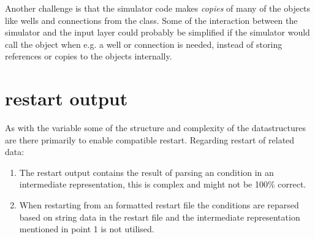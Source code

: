 Another challenge is that the simulator code makes \emph{copies} of many of the
objects like wells and connections from the  class. Some of
the interaction between the simulator and the input layer could probably be
simplified if the simulator would call the  object when
e.g. a well or connection is needed, instead of storing references or copies to
the  objects internally.

\section{\actionx{} restart output}
As with the \udq{} variable some of the structure and complexity of the
\actionx{} datastructures are there primarily to enable \eclipse{} compatible
restart. Regarding restart of \actionx{} related data:
\begin{enumerate}
  \item The restart output contains the result of parsing an \actionx{}
    condition in an intermediate representation, this is complex and might not
    be 100\% correct.
  \item When restarting \flow{} from an \eclipse{} formatted restart file the
    \actionx{} conditions are reparsed based on string data in the restart file
    and the intermediate representation mentioned in point 1 is not utilised.
\end{enumerate}
